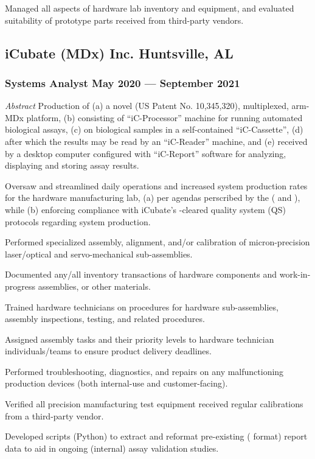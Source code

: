 \documentclass[letterpaper, oneside, 10pt]{article}
\begin{document}
Managed all aspects of hardware lab inventory and equipment, and evaluated
suitability of prototype parts received from third-party vendors.


\subsection*{iCubate (MDx) Inc.\DotSep{0.25em} Huntsville, AL}
\subsubsection*{Systems Analyst\DotSep{0.25em} May 2020 --- September 2021}

\textit{Abstract}\DotSep{0.25em} Production of (a) a novel (US Patent No.
10,345,320), multiplexed, arm- MDx platform, (b) consisting of
``iC-Processor'' machine for running automated biological assays, (c) on
biological samples in a self-contained ``iC-Cassette'', (d) after which the
results may be read by an ``iC-Reader'' machine, and (e) received by a desktop
computer configured with ``iC-Report'' software for analyzing, displaying and
storing assay results.

Oversaw and streamlined daily operations and increased system production rates
for the hardware manufacturing lab, (a) per agendas perscribed by the (
and ), while (b) enforcing compliance with iCubate's -cleared
quality system (QS) protocols regarding system production.

Performed specialized assembly, alignment, and/or calibration of
micron-precision laser/optical and servo-mechanical sub-assemblies.

Documented any/all inventory transactions of hardware components and
work-in-progress assemblies, or other materials.

Trained hardware technicians on procedures for hardware sub-assemblies,
assembly inspections, testing, and related procedures.

Assigned assembly tasks and their priority levels to hardware technician
individuals/teams to ensure product delivery deadlines.

Performed troubleshooting, diagnostics, and repairs on any malfunctioning
production devices (both internal-use and customer-facing).

Verified all precision manufacturing test equipment received regular
calibrations from a third-party vendor.

Developed scripts (Python) to extract and reformat pre-existing (
format) report data to aid in ongoing (internal) assay validation studies.
\end{document}
